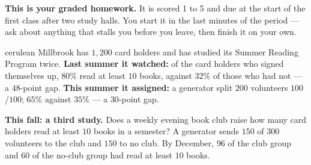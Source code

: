 \documentclass[12pt]{article}
\begin{document}

\vspace{0.12in}

\begin{remindbox}
\small
\textbf{This is your graded homework.} It is scored 1 to 5 and due at the start of the first
class after two study halls. You start it in the last minutes of the period --- ask about
anything that stalls you before you leave, then finish it on your own.
\end{remindbox}

\vspace{0.08in}

\boxguard[20]
\begin{scenariobox}{cerulean}
Millbrook has $1{,}200$ card holders and has studied its Summer Reading Program twice.
\textbf{Last summer it watched:} of the card holders who signed themselves up, $80\%$ read at
least $10$ books, against $32\%$ of those who had not --- a $48$-point gap. \textbf{This summer
it assigned:} a generator split $200$ volunteers $100$/$100$; $65\%$ against $35\%$ --- a
$30$-point gap.

\vspace{2pt}
\textbf{This fall: a third study.} Does a weekly evening book club raise how many card holders
read at least $10$ books in a semester? A generator sends $150$ of $300$ volunteers to the club
and $150$ to no club. By December, $96$ of the club group and $60$ of the no-club group had
read at least $10$ books.
\end{scenariobox}

\vspace{0.08in}
\end{document}
